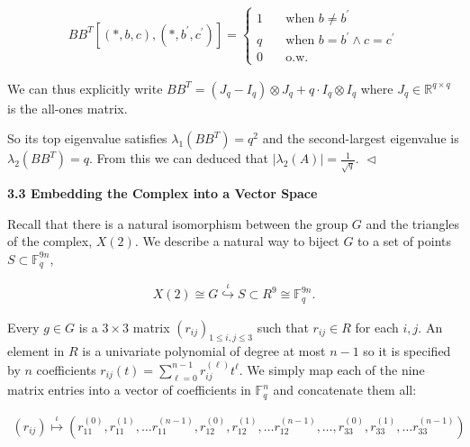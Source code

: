 \[\begin{gathered}
BB^{T}[(*,b,c),(*,b^{\prime},c^{\prime})]=\begin{cases}1\quad&\text{when }b\neq b^{\prime}\\
q&\text{when }b=b^{\prime}\land c=c^{\prime}\\
0&\text{o.w.}\end{cases}
\end{gathered}\]




We can thus explicitly write $BB^{T}=(J_{q}-I_{q})\otimes J_{q}+q\cdot I_{q}\otimes I_{q}$ where $J_{q}\in\mathbb{R}^{q\times q}$ is the all-ones matrix.\par




So its top eigenvalue satisfies $\lambda_{1}(BB^{T})=q^{2}$ and the second-largest eigenvalue is $\lambda_{2}(BB^{T})=q$. From this we can deduced that $|\lambda_{2}(A)|=\frac{1}{\sqrt{q}}$.
$\vartriangleleft$\par






\par\medskip\noindent\textbf{
3.3 Embedding the Complex into a Vector Space}\par




Recall that there is a natural isomorphism between the group $G$ and the triangles of the complex, $X(2)$. We describe a natural way to biject $G$ to a set of points $S\subset\mathbb{F}_{q}^{9n}$,\par


\[\begin{gathered}
X(2)\cong G\stackrel{{\scriptstyle\iota}}{{\hookrightarrow}}S\subset R^{9}\cong\mathbb{F}_{q}^{9n}.
\end{gathered}\]


Every $g\in G$ is a $3\times 3$ matrix $(r_{ij})_{1\leq i,j\leq 3}$ such that $r_{ij}\in R$ for each $i,j$. An element in $R$ is a univariate polynomial of degree at most $n-1$ so it is specified by $n$ coefficients $r_{ij}(t)=\sum_{\ell=0}^{n-1}r_{ij}^{(\ell)}t^{\ell}$. We simply map each of the nine matrix entries into a vector of coefficients in $\mathbb{F}_{q}^{n}$ and concatenate them all:\par


\[\begin{gathered}
(r_{ij})\stackrel{{\scriptstyle\iota}}{{\longmapsto}}\left(r^{(0)}_{11},r^{(1)}_{11},\ldots r^{(n-1)}_{11},r^{(0)}_{12},r^{(1)}_{12},\ldots r^{(n-1)}_{12},\ldots,r^{(0)}_{33},r^{(1)}_{33},\ldots r^{(n-1)}_{33}\right)
\end{gathered}\]



